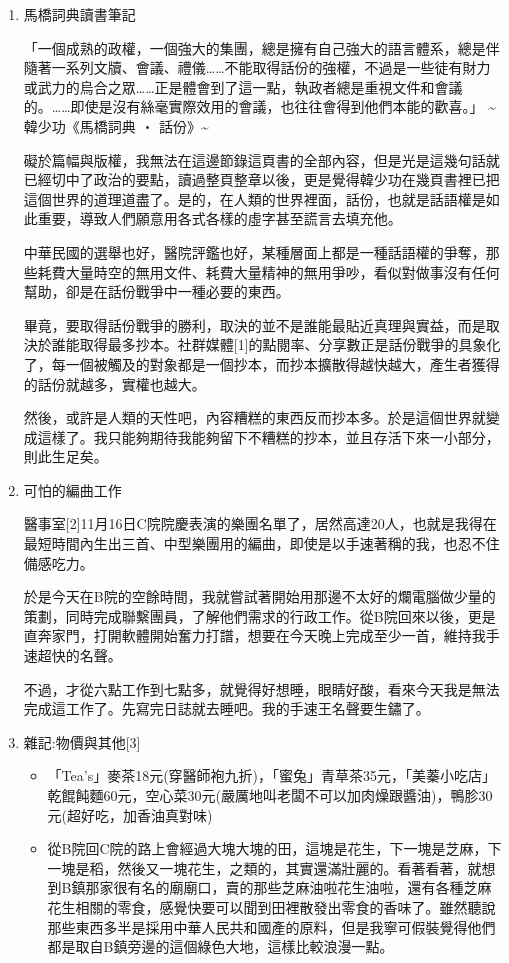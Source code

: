 \documentclass[
]{article}
\providecommand{\tightlist}{%
  \setlength{\itemsep}{0pt}\setlength{\parskip}{0pt}}
\begin{document}
\begin{enumerate}
\def\labelenumi{\arabic{enumi}.}
\item
  馬橋詞典讀書筆記

  「一個成熟的政權，一個強大的集團，總是擁有自己強大的語言體系，總是伴隨著一系列文牘、會議、禮儀\ldots\ldots 不能取得話份的強權，不過是一些徒有財力或武力的烏合之眾\ldots\ldots 正是體會到了這一點，執政者總是重視文件和會議的。\ldots\ldots 即使是沒有絲毫實際效用的會議，也往往會得到他們本能的歡喜。」
  \textasciitilde{} 韓少功《馬橋詞典 ‧ 話份》\textasciitilde{}

  礙於篇幅與版權，我無法在這邊節錄這頁書的全部內容，但是光是這幾句話就已經切中了政治的要點，讀過整頁整章以後，更是覺得韓少功在幾頁書裡已把這個世界的道理道盡了。是的，在人類的世界裡面，話份，也就是話語權是如此重要，導致人們願意用各式各樣的虛字甚至謊言去填充他。

  中華民國的選舉也好，醫院評鑑也好，某種層面上都是一種話語權的爭奪，那些耗費大量時空的無用文件、耗費大量精神的無用爭吵，看似對做事沒有任何幫助，卻是在話份戰爭中一種必要的東西。

  畢竟，要取得話份戰爭的勝利，取決的並不是誰能最貼近真理與實益，而是取決於誰能取得最多抄本。社群媒體{[}1{]}的點閱率、分享數正是話份戰爭的具象化了，每一個被觸及的對象都是一個抄本，而抄本擴散得越快越大，產生者獲得的話份就越多，實權也越大。

  然後，或許是人類的天性吧，內容糟糕的東西反而抄本多。於是這個世界就變成這樣了。我只能夠期待我能夠留下不糟糕的抄本，並且存活下來一小部分，則此生足矣。
\item
  可怕的編曲工作

  醫事室{[}2{]}11月16日C院院慶表演的樂團名單了，居然高達20人，也就是我得在最短時間內生出三首、中型樂團用的編曲，即使是以手速著稱的我，也忍不住備感吃力。

  於是今天在B院的空餘時間，我就嘗試著開始用那邊不太好的爛電腦做少量的策劃，同時完成聯繫團員，了解他們需求的行政工作。從B院回來以後，更是直奔家門，打開軟體開始奮力打譜，想要在今天晚上完成至少一首，維持我手速超快的名聲。

  不過，才從六點工作到七點多，就覺得好想睡，眼睛好酸，看來今天我是無法完成這工作了。先寫完日誌就去睡吧。我的手速王名聲要生鏽了。
\item
  雜記:物價與其他{[}3{]}

  \begin{itemize}
  \tightlist
  \item
    「Tea's」麥茶18元(穿醫師袍九折)，「蜜兔」青草茶35元，「美蓁小吃店」乾餛飩麵60元，空心菜30元(嚴厲地叫老闆不可以加肉燥跟醬油)，鴨胗30元(超好吃，加香油真對味)
  \item
    從B院回C院的路上會經過大塊大塊的田，這塊是花生，下一塊是芝麻，下一塊是稻，然後又一塊花生，之類的，其實還滿壯麗的。看著看著，就想到B鎮那家很有名的廟廟口，賣的那些芝麻油啦花生油啦，還有各種芝麻花生相關的零食，感覺快要可以聞到田裡散發出零食的香味了。雖然聽說那些東西多半是採用中華人民共和國產的原料，但是我寧可假裝覺得他們都是取自B鎮旁邊的這個綠色大地，這樣比較浪漫一點。
  \end{itemize}
\end{enumerate}
\end{document}
